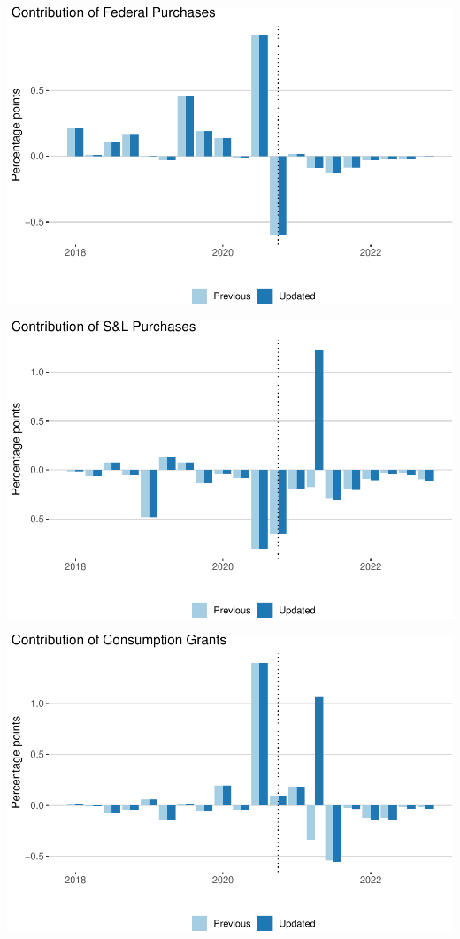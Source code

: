 \documentclass[
]{article}
\begin{document}
\begin{center}\includegraphics{compare-update_files/figure-latex/purchases-federal-1} \end{center}

\begin{center}\includegraphics{compare-update_files/figure-latex/purchases-state-1} \end{center}

\begin{center}\includegraphics{compare-update_files/figure-latex/cgrants-1} \end{center}
\end{document}
